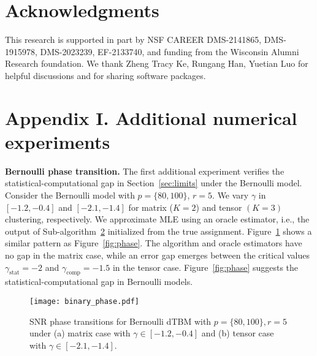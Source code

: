 \documentclass[lettersize,onecolumn,journal]{IEEEtran}
\theoremstyle{definition}
\theoremstyle{definition}
\begin{document}
\section*{Acknowledgments}
This research is supported in part by NSF CAREER DMS-2141865, DMS-1915978, DMS-2023239, EF-2133740, and funding from the Wisconsin Alumni Research foundation. We thank Zheng Tracy Ke, Rungang Han, Yuetian Luo for helpful discussions and for sharing software packages. 






\newpage
\appendix

{  
\section*{Appendix I. Additional numerical experiments}
\textbf{Bernoulli phase transition.} The first additional experiment verifies the statistical-computational gap in Section~\ref{sec:limits} under the Bernoulli model. Consider the Bernoulli model with $p = \{80, 100\}$, $r = 5$. We vary $\gamma $ in $ [-1.2, -0.4]$ and $[-2.1, -1.4]$ for matrix ($K=2$) and tensor $(K = 3)$ clustering, respectively. We  approximate MLE using an oracle estimator, i.e., the output of Sub-algorithm~\hyperref[alg:main]{2} initialized from the true assignment. Figure~\ref{fig:phase_binary} shows a similar pattern as Figure~\ref{fig:phase}. The algorithm and oracle estimators have no gap in the matrix case, while an error gap emerges between the critical values $\gamma_{\text{stat}} = -2$ and $\gamma_{\text{comp}} = -1.5$ in the tensor case. Figure~\ref{fig:phase} suggests the statistical-computational gap in Bernoulli models.

\begin{figure}[htb]
    \centering
    \texttt{[image: binary\_phase.pdf]}
    \caption{SNR phase transitions for Bernoulli dTBM with $p = \{80, 100\}, r = 5$ under (a) matrix case with $\gamma \in [-1.2, -0.4]$ and (b) tensor case with $ \gamma \in [-2.1, -1.4]$.}
    \label{fig:phase_binary}
\end{figure}

}
\end{document}
